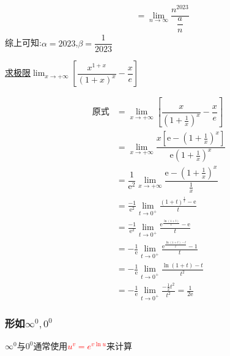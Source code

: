 \documentclass[8pt a4paper, oneside, UTF8]{ctexbook}
\begin{document}
\begin{sloppypar}
\begin{solution}
\begin{align*}
          & = \lim_{n \to \infty} \dfrac{n^{2023}}{\dfrac{a}{n}}
        \end{align*}
        综上可知:$\alpha =2023$,$\beta=\dfrac{1}{2023}$
    \end{solution}
    \begin{problem}
        \uline{求极限}$\lim_{x\to+\infty}[\dfrac{x^{1+x}}{\left(1+x\right)^x}-\dfrac xe]$
    \end{problem}
    \begin{solution}
        \begin{align*}
          \text{原式} & =\lim_{x\to+\infty}\left[\dfrac{x}{\left(1+\frac{1}{x}\right)^{x}}-\dfrac{x}{e}\right] \\
          & =\lim_{x\to+\infty}\dfrac{x\left[\mathrm{e}-\left(1+\frac{1}{x}\right)^{x}\right]}{\mathrm{e}\left(1+\frac{1}{x}\right)^{x}} \\
          & =\dfrac1{\mathrm{e}^2}\lim_{x\to+\infty}\dfrac{\mathrm{e}-\left(1+\frac1x\right)^x}{\frac1x} \\
          & = \frac{-1}{\mathrm{e}^2}\lim_{t\to0^+}\frac{(1+t)^{\frac1t}-\mathrm{e}}t\\
          & =\frac{-1}{\mathrm{e}^2}\lim_{t\to0^+}\frac{\mathrm{e}^{\frac{\ln(1+t)}t}-\mathrm{e}}t\\
          & = -\frac1{\mathrm{e}}\lim_{t\to0^+}\frac{\mathrm{e}^{\frac{\ln(1+t)-t}t}-1}t\\
          & = -\frac{1}{\mathrm{e}}\lim_{t\to0^{+}}\frac{\ln(1+t)-t}{t^{2}} \\
          & =-\frac1{\mathrm{e}}\operatorname*{lim}_{t\to0^+}\frac{-\frac12t^2}{t^2}=\frac1{2\mathrm{e}}
        \end{align*}
    \end{solution}

    \subsubsection{形如$\infty^0,0^0$}
          $\infty ^0$与$0^0$通常使用\textcolor{red}{$ u^v=e^{v \ln u}$}来计算

\end{sloppypar}
\end{document}
